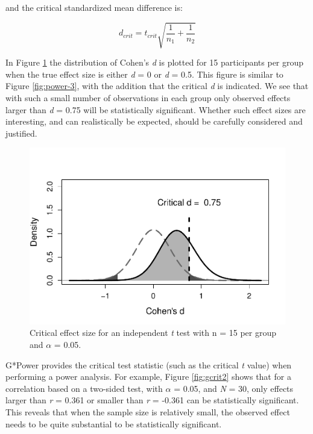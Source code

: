 \documentclass[
  english,
  ,jou,floatsintext]{apa6}
\begin{document}
and the critical standardized mean difference is:

\[d_{crit} = t_{crit}{\sqrt{\frac{1}{n_1} + \frac{1}{n_2}}}\]

In Figure \ref{fig:power-effect1} the distribution of Cohen's \emph{d} is plotted for 15 participants per group when the true effect size is either \emph{d} = 0 or \emph{d} = 0.5. This figure is similar to Figure \ref{fig:power-3}, with the addition that the critical \emph{d} is indicated. We see that with such a small number of observations in each group only observed effects larger than \emph{d} = 0.75 will be statistically significant. Whether such effect sizes are interesting, and can realistically be expected, should be carefully considered and justified.

\begin{figure}
\centering
\includegraphics{sample_size_justification_files/figure-latex/power-effect1-1.pdf}
\caption{\label{fig:power-effect1}Critical effect size for an independent \emph{t} test with n = 15 per group and \(\alpha\) = 0.05.}
\end{figure}

G*Power provides the critical test statistic (such as the critical \emph{t} value) when performing a power analysis. For example, Figure \ref{fig:gcrit2} shows that for a correlation based on a two-sided test, with \(\alpha\) = 0.05, and \emph{N} = 30, only effects larger than \emph{r} = 0.361 or smaller than \emph{r} = -0.361 can be statistically significant. This reveals that when the sample size is relatively small, the observed effect needs to be quite substantial to be statistically significant.
\end{document}
